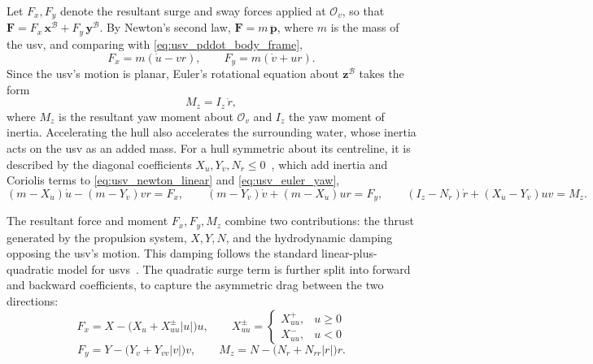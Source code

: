 Let $F_x, F_y$ denote the resultant surge and sway forces applied at $\mathcal{O}_v$, so that $\mathbf{F} = F_x\,\mathbf{x}^{\mathcal{B}} + F_y\,\mathbf{y}^{\mathcal{B}}$. By Newton's second law, $\mathbf{F} = m\,\ddot{\mathbf{p}}$, where $m$ is the mass of the \gls{usv}, and comparing with \eqref{eq:usv_pddot_body_frame},
\begin{equation}
    F_x = m(\dot{u} - vr), \qquad F_y = m(\dot{v} + ur).
    \label{eq:usv_newton_linear}
\end{equation}
Since the \gls{usv}'s motion is planar, Euler's rotational equation about $\mathbf{z}^{\mathcal{B}}$ takes the form
\begin{equation}
    M_z = I_z\,\dot{r},
    \label{eq:usv_euler_yaw}
\end{equation}
where $M_z$ is the resultant yaw moment about $\mathcal{O}_v$ and $I_z$ the yaw moment of inertia.
Accelerating the hull also accelerates the surrounding water, whose inertia acts on the \gls{usv} as an added mass. For a hull symmetric about its centreline, it is described by the diagonal coefficients $X_{\dot u}, Y_{\dot v}, N_{\dot r} \le 0$~\cite{fossenHandbookMarineCraft2011}, which add inertia and Coriolis terms to \eqref{eq:usv_newton_linear} and \eqref{eq:usv_euler_yaw},
\begin{equation}
    (m - X_{\dot u})\dot{u} - (m - Y_{\dot v})vr = F_x, \qquad
    (m - Y_{\dot v})\dot{v} + (m - X_{\dot u})ur = F_y, \qquad
    (I_z - N_{\dot r})\dot{r} + (X_{\dot u} - Y_{\dot v})uv = M_z.
    \label{eq:usv_added_mass}
\end{equation}

The resultant force and moment $F_x, F_y, M_z$ combine two contributions: the thrust generated by the propulsion system, $X, Y, N$, and the hydrodynamic damping opposing the \gls{usv}'s motion. This damping follows the standard linear-plus-quadratic model for \glspl{usv}~\cite{fossenHandbookMarineCraft2011}. The quadratic surge term is further split into forward and backward coefficients, to capture the asymmetric drag between the two directions:
\begin{equation}
    F_x = X - \big(X_u + X_{uu}^{\pm}|u|\big)u, \qquad
    X_{uu}^{\pm} = \begin{cases} X_{uu}^{+}, & u \geq 0 \\ X_{uu}^{-}, & u < 0 \end{cases}
    \label{eq:usv_damping_surge}
\end{equation}
\begin{equation}
    F_y = Y - \big(Y_v + Y_{vv}|v|\big)v, \qquad
    M_z = N - \big(N_r + N_{rr}|r|\big)r.
    \label{eq:usv_damping_sway_yaw}
\end{equation}

